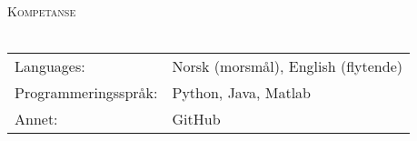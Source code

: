 \documentclass[a4paper]{article}
\newcommand{\lineunder} {
    \vspace*{-8pt} \\
    \hspace*{-18pt} \hrulefill \\
}
\newcommand{\header} [1] {
    {\hspace*{-18pt}\vspace*{6pt} \textsc{#1}}
    \vspace*{-6pt} \lineunder
}
\begin{document}
\header{Kompetanse}
\begin{tabular}{ l l }
    Languages:             & Norsk (morsmål), English (flytende) \\
	Programmeringsspråk: & Python, Java, Matlab                            \\
 Annet: & GitHub
	                                        \\
\end{tabular}
\vspace{2mm}
\end{document}
